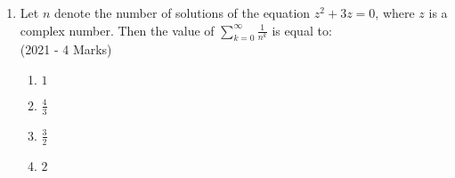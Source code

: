 \documentclass[journal]{IEEEtran}
\begin{document}
\begin{enumerate}
{		}

    \item{
        
            Let $n$ denote the number of solutions of the equation $z^2 + 3z = 0$, where $z$ is a complex number. Then the value of $\sum_{k=0}^{\infty} \frac{1}{n^k}$ is equal to:\\ \text{ }
             \hfill
              {(2021 - 4 Marks)}
			\begin{multicols}{4}              
	              	\begin{enumerate}
	              		\item $1$
	              		\item $\frac{4}{3}$
	              		\item $\frac{3}{2}$
	              		\item $2$
	              	\end{enumerate}
  			\end{multicols}      
        }
    \end{enumerate}
\end{document}
